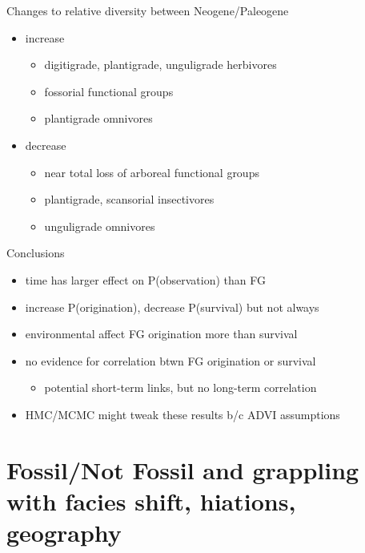 \documentclass{beamer}
\begin{document}
\begin{frame}
  \begin{block}{Changes to relative diversity between Neogene/Paleogene}
    \begin{itemize}
      \item \alert{increase}
        \begin{itemize}
          \item digitigrade, plantigrade, unguligrade herbivores
          \item fossorial functional groups
          \item plantigrade omnivores
        \end{itemize}
      \item \alert{decrease}
        \begin{itemize}
          \item near total loss of arboreal functional groups
          \item plantigrade, scansorial insectivores
          \item unguligrade omnivores
        \end{itemize}
    \end{itemize}
  \end{block}
\end{frame}

\begin{frame}
  \begin{alertblock}{Conclusions}
    \begin{itemize}
      \item time has larger effect on P(observation) than FG 
      \item increase P(origination), decrease P(survival) but not always 
      \item environmental affect FG origination more than survival
      \item no evidence for correlation btwn FG origination or survival
        \begin{itemize}
          \item potential short-term links, but no long-term correlation
        \end{itemize}
      \item HMC/MCMC might tweak these results b/c ADVI assumptions
    \end{itemize}
  \end{alertblock}
\end{frame}




\section{Fossil/Not Fossil and grappling with facies shift, hiations, geography}
\end{document}
